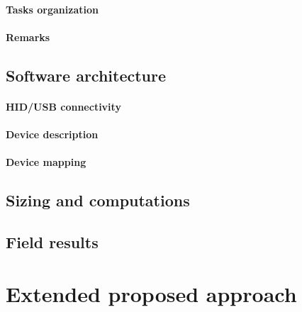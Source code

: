 \documentclass[a4paper,10pt]{article}
\begin{document}
\begin{multicols}{2}
\paragraph{Tasks organization}
\TODO


\paragraph{Remarks}
\TODO


\subsection{Software architecture}

\TODO


\paragraph{HID/USB connectivity}
\TODO


\paragraph{Device description}
\TODO


\paragraph{Device mapping}
\TODO


\subsection{Sizing and computations}

\TODO


\subsection{Field results}

\TODO


\section{Extended proposed approach}

\TODO



\end{multicols}
\end{document}
